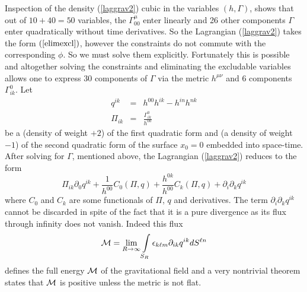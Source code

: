Inspection of the density (\ref{laggrav2}) cubic in the 
variables $(h,\Gamma)$, shows that out of
$ 10 + 40 = 50$  variables, the  $\Gamma_{00}^\mu$ enter
linearly and 26 other components $\Gamma$ enter
quadratically without time derivatives.
So the Lagrangian (\ref{laggrav2}) takes the form $(\ref{elimexcl})$, 
however the 
constraints do not commute with the corresponding $\phi$.
So we must solve them explicitly.
Fortunately this is possible and altogether solving the
constraints and eliminating the excludable variables
allows one to express 30 components of $\Gamma$ via the metric
$h^{\mu \nu}$ and 6 components $\Gamma_{ik}^0$.
Let 
\begin{eqnarray*}
q^{ik} &=& h^{00}h^{ik}-h^{in}h^{nk}\\
\Pi_{ik} &=& \frac{\Gamma_{ik}^0}{h^{00}}
\end{eqnarray*}
be a (density of weight $+2$) of the first
quadratic form and (a density of weight $-1$) of the
second quadratic form of the surface ${x}_0=0$ embedded
into space-time.
After solving for $\Gamma$, mentioned above, the
Lagrangian (\ref{laggrav2}) reduces to the form
$$
\Pi_{ik}\partial_0 q^{ik}+\frac{1}{h^{00}}C_0(\Pi,q)+
\frac{h^{0k}}{h^{00}}C_k(\Pi,q)+\partial_i\partial_k
q^{ik}
$$
where $C_0$ and $C_k$ are some functionals of $\Pi$,
$q$ and  derivatives.
The term $\partial_i\partial_k q^{ik}$ cannot be
discarded in spite of the fact that it is a pure divergence as its
flux through infinity does not vanish.
Indeed this flux
$$
{\mbox{$\cal M$}}=\lim_{R \to \infty}\int\limits_{S_R}
\epsilon_{k\ell m}\partial_{ik}q^{ik}dS^{\ell n}
$$
defines the full energy ${\mbox{$\cal M$}}$ of the gravitational
field and a very nontrivial theorem states  that
${\mbox{$\cal M$}}$ is positive unless the metric is not flat.


